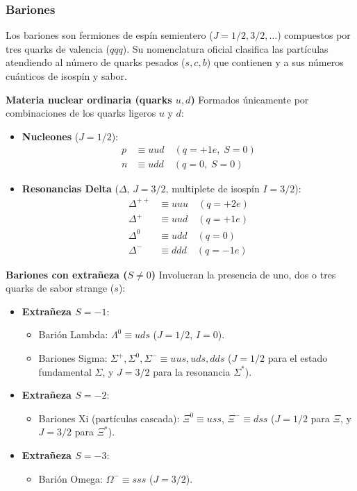 \subsubsection{Bariones}

Los bariones son fermiones de espín semientero ($J = 1/2, 3/2, \dots$) compuestos por tres quarks de valencia ($qqq$). Su nomenclatura oficial clasifica las partículas atendiendo al número de quarks pesados ($s, c, b$) que contienen y a sus números cuánticos de isospín y sabor.

\textbf{Materia nuclear ordinaria (quarks $u, d$)}
Formados únicamente por combinaciones de los quarks ligeros $u$ y $d$:
\begin{itemize}
    \item \textbf{Nucleones} ($J = 1/2$):
    \begin{align}
        p &\equiv uud \quad (q = +1e, \; S = 0) \\
        n &\equiv udd \quad (q = 0, \; S = 0)
    \end{align}
    \item \textbf{Resonancias Delta} ($\Delta$, $J = 3/2$, multiplete de isospín $I = 3/2$):
    \begin{align}
        \Delta^{++} &\equiv uuu \quad (q = +2e) \\
        \Delta^+ &\equiv uud \quad (q = +1e) \\
        \Delta^0 &\equiv udd \quad (q = 0) \\
        \Delta^- &\equiv ddd \quad (q = -1e)
    \end{align}
\end{itemize}

\textbf{Bariones con extrañeza ($S \neq 0$)}
Involucran la presencia de uno, dos o tres quarks de sabor strange ($s$):
\begin{itemize}
    \item \textbf{Extrañeza $S = -1$}:
    \begin{itemize}
        \item Barión Lambda: $\Lambda^0 \equiv uds$ ($J = 1/2$, $I=0$).
        \item Bariones Sigma: $\Sigma^+, \Sigma^0, \Sigma^- \equiv uus, uds, dds$ ($J = 1/2$ para el estado fundamental $\Sigma$, y $J = 3/2$ para la resonancia $\Sigma^*$).
    \end{itemize}
    \item \textbf{Extrañeza $S = -2$}:
    \begin{itemize}
        \item Bariones Xi (partículas cascada): $\Xi^0 \equiv uss$, $\Xi^- \equiv dss$ ($J = 1/2$ para $\Xi$, y $J = 3/2$ para $\Xi^*$).
    \end{itemize}
    \item \textbf{Extrañeza $S = -3$}:
    \begin{itemize}
        \item Barión Omega: $\Omega^- \equiv sss$ ($J = 3/2$).
    \end{itemize}
\end{itemize}


